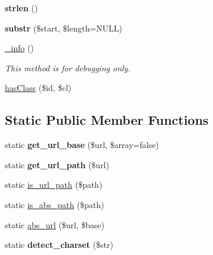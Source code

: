 \begin{DoxyCompactItemize}
{\bfseries strlen} ()
\item 
\mbox{\label{classduzun_1_1hQuery_1_1HTML__Parser_a06489bb4d115433e9a162f75d4494fd2}} 
{\bfseries substr} (\$start, \$length=N\+U\+LL)
\item 
\mbox{\label{classduzun_1_1hQuery_1_1HTML__Parser_a1f96e82fbe66a54108e2e152dde3f3f3}} 
\mbox{\hyperlink{classduzun_1_1hQuery_1_1HTML__Parser_a1f96e82fbe66a54108e2e152dde3f3f3}{\+\_\+info}} ()
\begin{DoxyCompactList}\small\item\em This method is for debugging only. \end{DoxyCompactList}\item 
\mbox{\hyperlink{classduzun_1_1hQuery_1_1HTML__Parser_a3c297951a22371649ceebfc1888523ed}{has\+Class}} (\$id, \$cl)
\end{DoxyCompactItemize}
\subsection*{Static Public Member Functions}
\begin{DoxyCompactItemize}
\item 
\mbox{\label{classduzun_1_1hQuery_1_1HTML__Parser_a98cf1892a2d6fcc550efb7f7d15ec719}} 
static {\bfseries get\+\_\+url\+\_\+base} (\$url, \$array=false)
\item 
\mbox{\label{classduzun_1_1hQuery_1_1HTML__Parser_ac207a5ca705d907faf143dbab4a03867}} 
static {\bfseries get\+\_\+url\+\_\+path} (\$url)
\item 
static \mbox{\hyperlink{classduzun_1_1hQuery_1_1HTML__Parser_ae0f17bc6b740af406a317dc79ae09dbd}{is\+\_\+url\+\_\+path}} (\$path)
\item 
static \mbox{\hyperlink{classduzun_1_1hQuery_1_1HTML__Parser_a0649133c5b89b3b1692546e9fe4c2442}{is\+\_\+abs\+\_\+path}} (\$path)
\item 
static \mbox{\hyperlink{classduzun_1_1hQuery_1_1HTML__Parser_acbbb861c06ae362dac6e67e05d296385}{abs\+\_\+url}} (\$url, \$base)
\item 
\mbox{\label{classduzun_1_1hQuery_1_1HTML__Parser_a53dbf11c4d369a2235d871c19a3a389d}} 
static {\bfseries detect\+\_\+charset} (\$str)
\end{DoxyCompactItemize}
